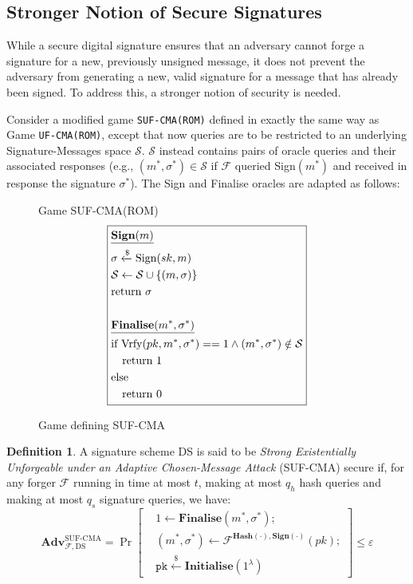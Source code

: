 \documentclass[]{final_report}
\theoremstyle{definition}
\newtheorem{definition}{Definition}[chapter]
\begin{document}
\subsection{Stronger Notion of Secure Signatures}
While a secure digital signature ensures that an adversary cannot forge a signature for a new, previously unsigned message, it does not prevent the adversary from generating a new, valid signature for a message that has already been signed. To address this, a stronger notion of security is needed.

Consider a modified game \texttt{SUF-CMA(ROM)} defined in exactly the same way as Game \texttt{UF-CMA(ROM)}, except that  now queries are to be restricted to an underlying Signature-Messages space $\mathcal{S}$. $\mathcal{S}$ instead contains pairs of oracle queries and their associated responses (e.g., $(m^*, \sigma^*) \in \mathcal{S}$ if  $\mathcal{F}$ queried Sign$(m^*)$ and received in response the signature $\sigma^*$). The Sign and Finalise oracles are adapted as follows:
\begin{figure}[H]
\centering
\hfill Game SUF-CMA(ROM)\hfill\phantom{} 
\[
\boxed{
\begin{aligned}
&\underline{\textbf{\text{Sign}}(m)} \\
&\sigma \xleftarrow{\$} \text{Sign}(sk, m) \\
&\mathcal{S} \leftarrow \mathcal{S} \cup\{(m, \sigma)\} \\
&\text{return } \sigma \\
\\
&\underline{\textbf{\text{Finalise}}(m^*, \sigma^*)} \\
&\text{if Vrfy}(pk, m^*, \sigma^*) == 1 \land (m^*, \sigma^*) \notin \mathcal{S} \\
&\quad \text{return } 1 \\
&\text{else} \\
&\quad \text{return } 0
\end{aligned}
}
\]
\caption{Game defining SUF-CMA}
\label{fig:crypto_game}
\end{figure} 
\begin{definition}
A signature scheme DS is said to be \emph{Strong Existentially Unforgeable under an Adaptive Chosen-Message Attack} (SUF-CMA) secure if, for any forger \(\mathcal{F}\) running in time at most \(t\), making at most \(q_h\) hash queries and making at most \(q_s\) signature queries, we have:
\[
\textbf{Adv}_{\mathcal{F},\text{DS}}^{\text{SUF-CMA}} = \Pr \left[ \begin{aligned} &1 \leftarrow \textbf{Finalise}(m^*, \sigma^*); \\ &(m^*, \sigma^*) \leftarrow \mathcal{F}^{\textbf{Hash}(\cdot),\textbf{Sign}(\cdot)}(pk); \\ &\texttt{pk} \xleftarrow{\$} \textbf{Initialise}(1^{\lambda}) \end{aligned} \right] \leq \varepsilon
\]
\end{definition}
\end{document}
